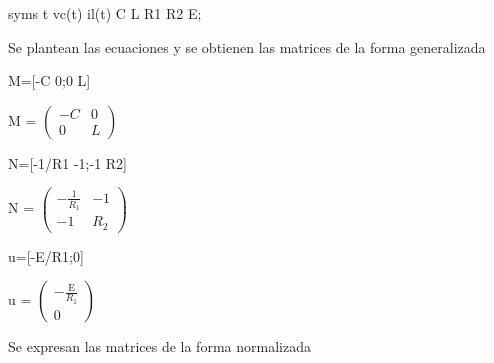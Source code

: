 \documentclass[10pt,a4paper]{article} %
\begin{document}
\begin{matlabcode}
	syms t vc(t) il(t) C L R1 R2 E;
\end{matlabcode}

\begin{par}
	\begin{flushleft}
		Se plantean las ecuaciones y se obtienen las matrices de la forma generalizada
	\end{flushleft}
\end{par}

\begin{matlabcode}
	M=[-C 0;0 L]
\end{matlabcode}
\begin{matlabsymbolicoutput}
	M = 
	$\displaystyle \left(\begin{array}{cc}
	-C & 0\\
	0 & L
	\end{array}\right)$
\end{matlabsymbolicoutput}
\begin{matlabcode}
	N=[-1/R1 -1;-1 R2]
\end{matlabcode}
\begin{matlabsymbolicoutput}
	N = 
	$\displaystyle \left(\begin{array}{cc}
	-\frac{1}{R_1 } & -1\\
	-1 & R_2 
	\end{array}\right)$
\end{matlabsymbolicoutput}
\begin{matlabcode}
	u=[-E/R1;0]
\end{matlabcode}
\begin{matlabsymbolicoutput}
	u = 
	$\displaystyle \left(\begin{array}{c}
	-\frac{\textrm{E}}{R_1 }\\
	0
	\end{array}\right)$
\end{matlabsymbolicoutput}

\begin{par}
	\begin{flushleft}
		Se expresan las matrices de la forma normalizada
	\end{flushleft}
\end{par}

\vspace{1em}
\end{document}
